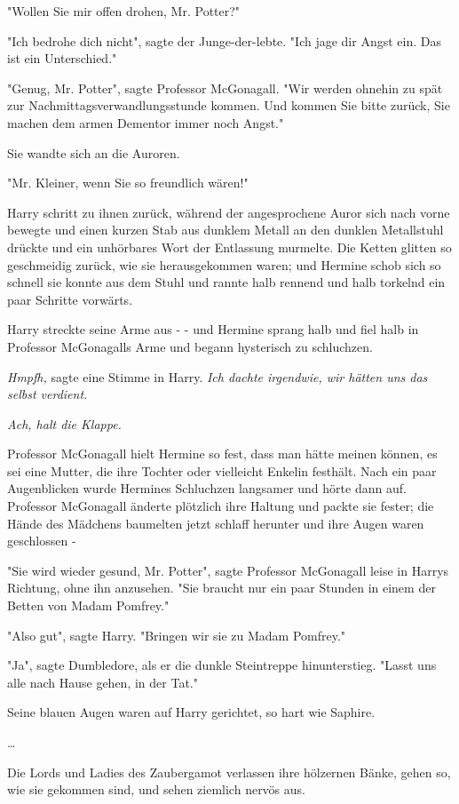 {"Wollen Sie mir offen drohen, Mr. Potter?"

"Ich bedrohe dich nicht", sagte der Junge-der-lebte. "Ich jage dir Angst ein. Das ist ein Unterschied."

"Genug, Mr. Potter", sagte Professor McGonagall. "Wir werden ohnehin zu spät zur Nachmittagsverwandlungsstunde kommen. Und kommen Sie bitte zurück, Sie machen dem armen Dementor immer noch Angst."

Sie wandte sich an die Auroren.

"Mr. Kleiner, wenn Sie so freundlich wären!"

Harry schritt zu ihnen zurück, während der angesprochene Auror sich nach vorne bewegte und einen kurzen Stab aus dunklem Metall an den dunklen Metallstuhl drückte und ein unhörbares Wort der Entlassung murmelte. Die Ketten glitten so geschmeidig zurück, wie sie herausgekommen waren; und Hermine schob sich so schnell sie konnte aus dem Stuhl und rannte halb rennend und halb torkelnd ein paar Schritte vorwärts.

Harry streckte seine Arme aus - - und Hermine sprang halb und fiel halb in Professor McGonagalls Arme und begann hysterisch zu schluchzen.

\emph{Hmpfh,} sagte eine Stimme in Harry. \emph{Ich dachte irgendwie, wir hätten uns das selbst verdient.}

\emph{Ach, halt die Klappe.}

Professor McGonagall hielt Hermine so fest, dass man hätte meinen können, es sei eine Mutter, die ihre Tochter oder vielleicht Enkelin festhält. Nach ein paar Augenblicken wurde Hermines Schluchzen langsamer und hörte dann auf. Professor McGonagall änderte plötzlich ihre Haltung und packte sie fester; die Hände des Mädchens baumelten jetzt schlaff herunter und ihre Augen waren geschlossen -

"Sie wird wieder gesund, Mr. Potter", sagte Professor McGonagall leise in Harrys Richtung, ohne ihn anzusehen. "Sie braucht nur ein paar Stunden in einem der Betten von Madam Pomfrey."

"Also gut", sagte Harry. "Bringen wir sie zu Madam Pomfrey."

"Ja", sagte Dumbledore, als er die dunkle Steintreppe hinunterstieg. "Lasst uns alle nach Hause gehen, in der Tat."

Seine blauen Augen waren auf Harry gerichtet, so hart wie Saphire.

…

Die Lords und Ladies des Zaubergamot verlassen ihre hölzernen Bänke, gehen so, wie sie gekommen sind, und sehen ziemlich nervös aus.

}
